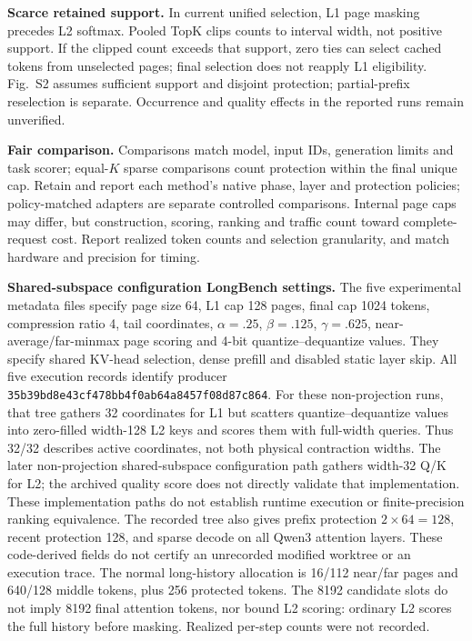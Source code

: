 \documentclass[10pt,letterpaper]{article}
\begin{document}
\textbf{Scarce retained support.} In current unified selection, L1 page masking precedes L2 softmax. Pooled TopK clips counts to interval width, not positive support. If the clipped count exceeds that support, zero ties can select cached tokens from unselected pages; final selection does not reapply L1 eligibility. Fig.~S2 assumes sufficient support and disjoint protection; partial-prefix reselection is separate. Occurrence and quality effects in the reported runs remain unverified.

\textbf{Fair comparison.} Comparisons match model, input IDs, generation limits and task scorer; equal-$K$ sparse comparisons count protection within the final unique cap. Retain and report each method's native phase, layer and protection policies; policy-matched adapters are separate controlled comparisons. Internal page caps may differ, but construction, scoring, ranking and traffic count toward complete-request cost. Report realized token counts and selection granularity, and match hardware and precision for timing.

\textbf{Shared-subspace configuration LongBench settings.} The five experimental metadata files specify page size 64, L1 cap 128 pages, final cap 1024 tokens, compression ratio 4, tail coordinates, $\alpha=.25$, $\beta=.125$, $\gamma=.625$, near-average/far-minmax page scoring and 4-bit quantize--dequantize values. They specify shared KV-head selection, dense prefill and disabled static layer skip. All five execution records identify producer \texttt{35b39bd8\allowbreak{}e43cf478\allowbreak{}bb4f0ab6\allowbreak{}4a8457f0\allowbreak{}8d87c864}. For these non-projection runs, that tree gathers 32 coordinates for L1 but scatters quantize--dequantize values into zero-filled width-128 L2 keys and scores them with full-width queries. Thus 32/32 describes active coordinates, not both physical contraction widths. The later non-projection shared-subspace configuration path gathers width-32 Q/K for L2; the archived quality score does not directly validate that implementation. These implementation paths do not establish runtime execution or finite-precision ranking equivalence. The recorded tree also gives prefix protection $2\times64=128$, recent protection 128, and sparse decode on all Qwen3 attention layers. These code-derived fields do not certify an unrecorded modified worktree or an execution trace. The normal long-history allocation is 16/112 near/far pages and 640/128 middle tokens, plus 256 protected tokens. The 8192 candidate slots do not imply 8192 final attention tokens, nor bound L2 scoring: ordinary L2 scores the full history before masking. Realized per-step counts were not recorded.
\end{document}
